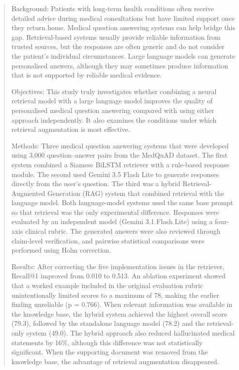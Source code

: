 \begin{abstract}

Background: Patients with long-term health conditions often receive detailed advice during medical consultations but have limited support once they return home. Medical question answering systems can help bridge this gap. Retrieval-based systems usually provide reliable information from trusted sources, but the responses are often generic and do not consider the patient's individual circumstances. Large language models can generate personalised answers, although they may sometimes produce information that is not supported by reliable medical evidence.

Objectives: This study truly investigates whether combining a neural retrieval model with a large language model improves the quality of personalised medical question answering compared with using either approach independently. It also examines the conditions under which retrieval augmentation is most effective.

Methods: Three medical question answering systems that were developed using 3,000 question--answer pairs from the MedQuAD dataset. The first system combined a Siamese BiLSTM retriever with a rule-based response module. The second used Gemini 3.5 Flash Lite to generate responses directly from the user's question. The third was a hybrid Retrieval-Augmented Generation (RAG) system that combined retrieval with the language model. Both language-model systems used the same base prompt so that retrieval was the only experimental difference. Responses were evaluated by an independent model (Gemini 3.1 Flash Lite) using a four-axis clinical rubric. The generated answers were also reviewed through claim-level verification, and pairwise statistical comparisons were performed using Holm correction.

Results: After correcting the five implementation issues in the retriever, Recall@1 improved from 0.010 to 0.513. An ablation experiment showed that a worked example included in the original evaluation rubric unintentionally limited scores to a maximum of 78, making the earlier finding unreliable (p = 0.766). When relevant information was available in the knowledge base, the hybrid system achieved the highest overall score (79.3), followed by the standalone language model (78.2) and the retrieval-only system (49.0). The hybrid approach also reduced hallucinated medical statements by 16\%, although this difference was not statistically significant. When the supporting document was removed from the knowledge base, the advantage of retrieval augmentation disappeared.


\end{abstract}
